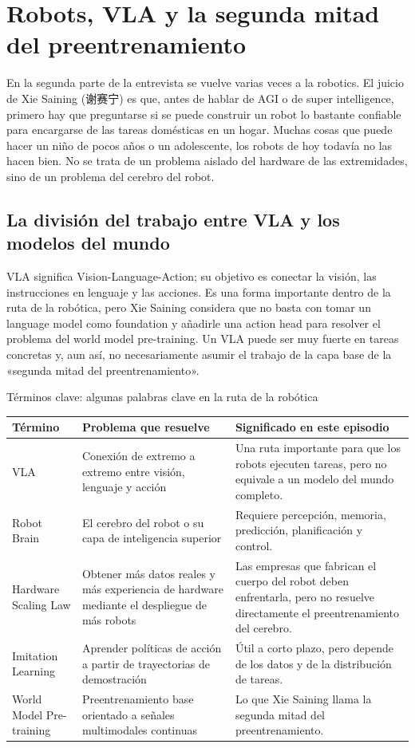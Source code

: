 \section{Robots, VLA y la segunda mitad del preentrenamiento}

En la segunda parte de la entrevista se vuelve varias veces a la robotics. El juicio de Xie Saining (谢赛宁) es que, antes de hablar de AGI o de super intelligence, primero hay que preguntarse si se puede construir un robot lo bastante confiable para encargarse de las tareas domésticas en un hogar. Muchas cosas que puede hacer un niño de pocos años o un adolescente, los robots de hoy todavía no las hacen bien. No se trata de un problema aislado del hardware de las extremidades, sino de un problema del cerebro del robot.

\subsection{La división del trabajo entre VLA y los modelos del mundo}

VLA significa Vision-Language-Action; su objetivo es conectar la visión, las instrucciones en lenguaje y las acciones. Es una forma importante dentro de la ruta de la robótica, pero Xie Saining considera que no basta con tomar un language model como foundation y añadirle una action head para resolver el problema del world model pre-training. Un VLA puede ser muy fuerte en tareas concretas y, aun así, no necesariamente asumir el trabajo de la capa base de la «segunda mitad del preentrenamiento».

\begin{knowledgebox}{Términos clave: algunas palabras clave en la ruta de la robótica}
\begin{tabularx}{\textwidth}{p{}p{}X}
\toprule
Término & Problema que resuelve & Significado en este episodio \\
\midrule
VLA & Conexión de extremo a extremo entre visión, lenguaje y acción & Una ruta importante para que los robots ejecuten tareas, pero no equivale a un modelo del mundo completo. \\
Robot Brain & El cerebro del robot o su capa de inteligencia superior & Requiere percepción, memoria, predicción, planificación y control. \\
Hardware Scaling Law & Obtener más datos reales y más experiencia de hardware mediante el despliegue de más robots & Las empresas que fabrican el cuerpo del robot deben enfrentarla, pero no resuelve directamente el preentrenamiento del cerebro. \\
Imitation Learning & Aprender políticas de acción a partir de trayectorias de demostración & Útil a corto plazo, pero depende de los datos y de la distribución de tareas. \\
World Model Pre-training & Preentrenamiento base orientado a señales multimodales continuas & Lo que Xie Saining llama la segunda mitad del preentrenamiento. \\
\bottomrule
\end{tabularx}
\end{knowledgebox}

